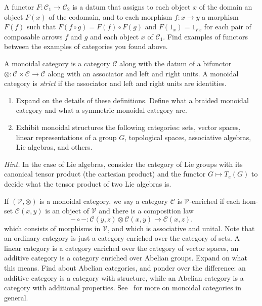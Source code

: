 \begin{question} A functor $F: \mathcal{C}_1\longrightarrow 
\mathcal{C}_2$ is a datum that assigns to each object
$x$ of the domain an object $F(x)$ of the codomain,
and to each morphism $f:x\to y$ a morphism $F(f)$ such
that $F(f\circ g) = F(f) \circ F(g)$ and $F(1_x) = 1_{Fx}$
for each pair of composable arrows $f$ and $g$ and each
object $x$ of $\mathcal C_1$. Find examples of functors
between the examples of categories you found above.

\end{question}
\begin{question} A monoidal category is a category $\mathcal C$ 
along with the datum of a bifunctor $\otimes :
\mathcal{C}\times \mathcal{C}\longrightarrow \mathcal{C}$
along with an associator and left and right units. 
A monoidal category is \emph{strict} if the associator and left
and right units are identities.
\begin{enumerate}
\item Expand on the details of these definitions. Define what
a braided monoidal category and what a symmetric monoidal category are.
\item Exhibit monoidal
structures the following categories: sets, vector spaces,
linear representations of a group $G$, topological spaces,
associative algebras, Lie algebras, and others.
\end{enumerate}
 \emph{Hint.} In the case of Lie algebras,
 consider the category of Lie groups with its
 canonical tensor product (the cartesian product) 
 and the functor $G\longmapsto T_e(G)$ to decide
 what the tensor product of two Lie algebras is.
\end{question}


\begin{question}
If $(\mathcal{V},\otimes)$ is a monoidal category, 
we say a category $\mathcal{C}$ 
is $\mathcal V$-enriched if each hom-set 
$\mathcal{C}(x,y)$ is an object of $\mathcal{V}$ and
there is a composition law 
\[-\circ -: \mathcal C(y,z) \otimes  \mathcal C(x,y) 
	\longrightarrow \mathcal C(x,z). \] 
which consists of morphisms in $\mathcal{V}$, and which is 
associative and unital. Note that an ordinary category is
just a category enriched over the category of sets.
A linear category is a category enriched over the
category of vector spaces, an additive category is a
category enriched over Abelian groups.
Expand on what this means. Find about Abelian
categories, and ponder over the difference: an additive
category is a category with structure, while an
Abelian category is a category with additional properties.
See~\cite{Kassel1995} for more on monoidal categories in
general.
\end{question}

